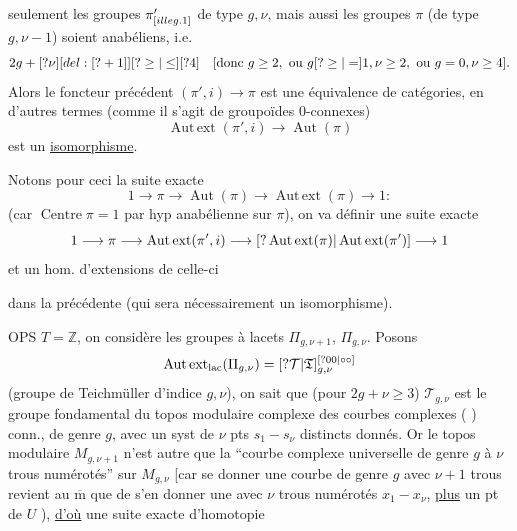 
seulement les groupes \(\pi'_{[illeg. 1]}\) de type \(g,\nu\), mais aussi les groupes \(\pi\) (de type \(g,\nu-1\)) soient anabéliens, i.e.
\[
2g+[?\nu][del: [?+1]][?\ge|\le][?4]
\quad
[\text{donc }g\ge2,\ \text{ou }g[?\ge|=]1,\nu\ge2,\ \text{ou }g=0,\nu\ge4].
\]
Alors le foncteur précédent \((\pi',i)\longrightarrow\pi\) est une équivalence de catégories, en d'autres termes (comme il s'agit de groupoïdes \(0\)-connexes)
\[
\operatorname{Aut\,ext}(\pi',i)\longrightarrow\operatorname{Aut}(\pi)
\]
est un \uline{isomorphisme}.

Notons pour ceci  la suite exacte
\[
1\longrightarrow\pi\longrightarrow\operatorname{Aut}(\pi)
\longrightarrow\operatorname{Aut\,ext}(\pi)\longrightarrow1:
\]
(car \(\operatorname{Centre}\pi=1\) par hyp anabélienne sur \(\pi\)),  on va définir une suite exacte
\[
1\longrightarrow\pi\longrightarrow\operatorname{Aut\,ext}(\pi',i)
\longrightarrow[?\operatorname{Aut\,ext}(\pi)|\operatorname{Aut\,ext}(\pi')]
\longrightarrow1
\]
et un hom. d'extensions de celle-ci


dans la précédente (qui sera nécessairement un isomorphisme).

OPS \(T=\mathbb Z\), on considère les groupes à lacets  \(\Pi_{g,\nu+1}\), \(\Pi_{g,\nu}\). Posons
\[
\operatorname{Aut\,ext}_{\mathrm{lac}}(\Pi_{g,\nu})
=[?\mathcal T|\mathfrak T]_{g,\nu}^{[?00|\circ\circ]}
\]
(groupe de Teichmüller d'indice \(g,\nu\)),
on sait que (pour \(2g+\nu\ge3\)) \(\mathcal T_{g,\nu}\) est le groupe fondamental du topos modulaire complexe  des courbes complexes ( ) conn., de genre \(g\), avec un syst de \(\nu\) pts \(s_1-\!s_\nu\) distincts donnés.
Or le topos modulaire \(M_{g,\nu+1}\) n'est autre que  la ``courbe complexe universelle  de genre \(g\) à \(\nu\) trous numérotés'' sur \(M_{g,\nu}\)
[car se donner une courbe  de genre \(g\) avec \(\nu+1\) trous  revient au \(\overline{\mathrm m}\) que de s'en donner une  avec \(\nu\) trous numérotés \(x_1-\!x_\nu\), \uline{plus} un  pt de \(U\) ), \uline{d'où} une suite exacte d'homotopie

